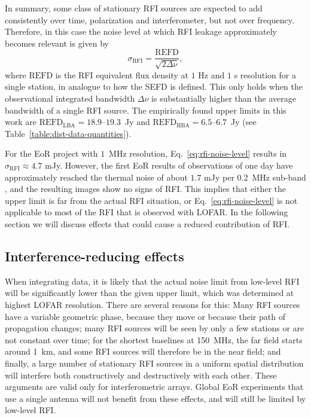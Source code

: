 \documentclass[useAMS,usenatbib]{mn2e}
\begin{document}
In summary, some class of stationary RFI sources are expected to add consistently over time, polarization and interferometer, but not over frequency. Therefore, in this case the noise level at which RFI leakage approximately becomes relevant is given by
\begin{equation} \label{eq:rfi-noise-level}
 \sigma_\textrm{RFI} = \frac{\textrm{REFD}}{\sqrt{2 \Delta \nu}},
\end{equation}
where $\textrm{REFD}$ is the RFI equivalent flux density at $1$ Hz and $1$ s resolution for a single station, in analogue to how the SEFD is defined. This only holds when the observational integrated bandwidth $\Delta \nu$ is substantially higher than the average bandwidth of a single RFI source. The empirically found upper limits in this work are $\textrm{REFD}_\textrm{LBA}=18.9$--$19.3$~Jy and $\textrm{REFD}_\textrm{HBA}=6.5$--$6.7$~Jy (see Table~\ref{table:dist-data-quantities}).

For the EoR project with $1$~MHz resolution, Eq.~\ref{eq:rfi-noise-level} results in $\sigma_\textrm{RFI}\approx 4.7$ mJy. However, the first EoR results of observations of one day have approximately reached the thermal noise of about $1.7$ mJy per 0.2~MHz sub-band \citep{ncp-eor-yatawatta}, and the resulting images show no signs of RFI. This implies that either the upper limit is far from the actual RFI situation, or Eq.~\ref{eq:rfi-noise-level} is not applicable to most of the RFI that is observed with LOFAR. In the following section we will discuss effects that could cause a reduced contribution of RFI.

\subsection{Interference-reducing effects} \label{sec:coherence-reduction}
When integrating data, it is likely that the actual noise limit from low-level RFI will be significantly lower than the given upper limit, which was determined at highest LOFAR resolution. There are several reasons for this: Many RFI sources have a variable geometric phase, because they move or because their path of propagation changes; many RFI sources will be seen by only a few stations or are not constant over time; for the shortest baselines at 150~MHz, the far field starts around 1~km, and some RFI sources will therefore be in the near field; and finally, a large number of stationary RFI sources in a uniform spatial distribution will interfere both constructively and destructively with each other. These arguments are valid only for interferometric arrays. Global EoR experiments that use a single antenna will not benefit from these effects, and will still be limited by low-level RFI.
\end{document}
